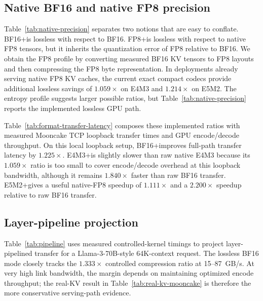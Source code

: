 

\subsection{Native BF16 and native FP8 precision}
\label{sec:native-precision}

Table~\ref{tab:native-precision} separates two notions that are easy to conflate. BF16+\splitzip is lossless with respect to BF16. FP8+\splitzip is lossless with respect to native FP8 tensors, but it inherits the quantization error of FP8 relative to BF16. We obtain the FP8 profile by converting measured BF16 KV tensors to FP8 layouts and then compressing the FP8 byte representation. In deployments already serving native FP8 KV caches, the current exact compact codecs provide additional lossless savings of $1.059\times$ on E4M3 and $1.214\times$ on E5M2. The entropy profile suggests larger possible ratios, but Table~\ref{tab:native-precision} reports the implemented lossless GPU path.



Table~\ref{tab:format-transfer-latency} composes these implemented ratios with measured Mooncake TCP loopback transfer times and GPU encode/decode throughput. On this local loopback setup, BF16+\splitzip improves full-path transfer latency by $1.225\times$. E4M3+\splitzip is slightly slower than raw native E4M3 because its $1.059\times$ ratio is too small to cover encode/decode overhead at this loopback bandwidth, although it remains $1.840\times$ faster than raw BF16 transfer. E5M2+\splitzip gives a useful native-FP8 speedup of $1.111\times$ and a $2.200\times$ speedup relative to raw BF16 transfer.



\subsection{Layer-pipeline projection}

Table~\ref{tab:pipeline} uses measured controlled-kernel timings to project layer-pipelined transfer for a Llama-3-70B-style 64K-context request. The lossless BF16 mode closely tracks the $1.333\times$ controlled compression ratio at 15--87~GB/s. At very high link bandwidth, the margin depends on maintaining optimized encode throughput; the real-KV result in Table~\ref{tab:real-kv-mooncake} is therefore the more conservative serving-path evidence.

